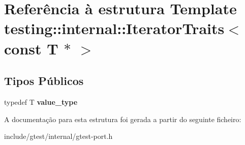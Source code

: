 \hypertarget{structtesting_1_1internal_1_1IteratorTraits_3_01const_01T_01_5_01_4}{\section{Referência à estrutura Template testing\-:\-:internal\-:\-:Iterator\-Traits$<$ const T $\ast$ $>$}
\label{structtesting_1_1internal_1_1IteratorTraits_3_01const_01T_01_5_01_4}
}
\subsection*{Tipos Públicos}
\begin{DoxyCompactItemize}
\item 
\hypertarget{structtesting_1_1internal_1_1IteratorTraits_3_01const_01T_01_5_01_4_ae7c8867223e106f374b56a7dc4a85547}{typedef T {\bfseries value\-\_\-type}}\label{structtesting_1_1internal_1_1IteratorTraits_3_01const_01T_01_5_01_4_ae7c8867223e106f374b56a7dc4a85547}

\end{DoxyCompactItemize}


A documentação para esta estrutura foi gerada a partir do seguinte ficheiro\-:\begin{DoxyCompactItemize}
\item 
include/gtest/internal/gtest-\/port.\-h\end{DoxyCompactItemize}
